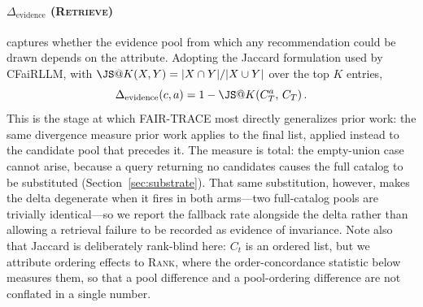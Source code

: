 \documentclass[manuscript,screen,review]{acmart}
\newcommand{\Devidence}{\Delta_{\mathrm{evidence}}}
\newcommand{\stage}[1]{\textsc{#1}}
\begin{document}
\paragraph{$\Devidence$ (\stage{Retrieve})}
captures whether the evidence pool from which any recommendation could be drawn
depends on the attribute. Adopting the Jaccard formulation used by CFaiRLLM, with
$\JS@K(X, Y) = |X \cap Y| / |X \cup Y|$ over the top $K$ entries,
\begin{equation}
  \Devidence(c, a) = 1 - \JS@K\!\left(C^{a}_{T},\, C_{T}\right).
  \label{eq:devidence}
\end{equation}
This is the stage at which FAIR-TRACE most directly generalizes prior work: the
same divergence measure prior work applies to the final list, applied instead to
the candidate pool that precedes it. The measure is total: the empty-union case
cannot arise, because a query returning no candidates causes the full catalog to
be substituted (Section~\ref{sec:substrate}). That same substitution, however,
makes the delta degenerate when it fires in both arms---two full-catalog pools are
trivially identical---so we report the fallback rate alongside the delta rather
than allowing a retrieval failure to be recorded as evidence of invariance. Note
also that Jaccard is deliberately rank-blind here: $C_t$ is an ordered list, but we
attribute ordering effects to \stage{Rank}, where the order-concordance statistic
below measures them, so that a pool difference and a pool-ordering difference are
not conflated in a single number.
\end{document}
